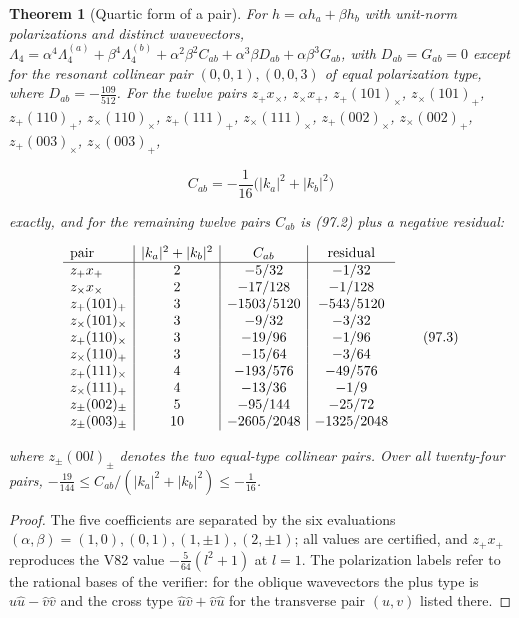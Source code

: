 \documentclass[11pt]{article}
\newtheorem{theorem}{Theorem}[section]
\theoremstyle{remark}
\begin{document}
\begin{theorem}[Quartic form of a pair]
\label{thm:v19v94-pairs}
For \(h=\alpha h_a+\beta h_b\) with unit-norm polarizations and
distinct wavevectors,
\(\Lambda_4=\alpha^4\Lambda_4^{(a)}+\beta^4\Lambda_4^{(b)}+\alpha^2\beta^2C_{ab}+\alpha^3\beta D_{ab}+\alpha\beta^3G_{ab}\),
with \(D_{ab}=G_{ab}=0\) except for the resonant collinear pair
\((0,0,1),(0,0,3)\) of equal polarization type, where
\(D_{ab}=-\tfrac{109}{512}\).  For the twelve pairs
\(z_+x_\times\), \(z_\times x_+\), \(z_+(101)_\times\), \(z_\times(101)_+\),
\(z_+(110)_+\), \(z_\times(110)_\times\), \(z_+(111)_+\), \(z_\times(111)_\times\),
\(z_+(002)_\times\), \(z_\times(002)_+\), \(z_+(003)_\times\), \(z_\times(003)_+\),

\[
 C_{ab}=-\frac1{16}\bigl(|k_a|^2+|k_b|^2\bigr)                          \tag{97.2}
\]

exactly, and for the remaining twelve pairs \(C_{ab}\) is (97.2) plus a
negative residual:

\[
\begin{array}{l|c|c|c}
\hbox{pair}&|k_a|^2+|k_b|^2&C_{ab}&\hbox{residual}\\ \hline
z_+x_+&2&-5/32&-1/32\\
z_\times x_\times&2&-17/128&-1/128\\
z_+(101)_+&3&-1503/5120&-543/5120\\
z_\times(101)_\times&3&-9/32&-3/32\\
z_+(110)_\times&3&-19/96&-1/96\\
z_\times(110)_+&3&-15/64&-3/64\\
z_+(111)_\times&4&-193/576&-49/576\\
z_\times(111)_+&4&-13/36&-1/9\\
z_\pm(002)_\pm&5&-95/144&-25/72\\
z_\pm(003)_\pm&10&-2605/2048&-1325/2048
\end{array}                                                            \tag{97.3}
\]

where \(z_\pm(00l)_\pm\) denotes the two equal-type collinear pairs.
Over all twenty-four pairs, \(-\tfrac{19}{144}\leq C_{ab}/(|k_a|^2+|k_b|^2)\leq-\tfrac1{16}\).
\end{theorem}

\begin{proof}
The five coefficients are separated by the six evaluations
\((\alpha,\beta)=(1,0),(0,1),(1,\pm1),(2,\pm1)\); all values are
certified, and \(z_+x_+\) reproduces the V82 value \(-\tfrac5{64}(l^2+1)\)
at \(l=1\).  The polarization labels refer to the rational bases of
the verifier: for the oblique wavevectors the plus type is
\(\hat u\hat u-\hat v\hat v\) and the cross type \(\hat u\hat v+\hat v\hat u\)
for the transverse pair \((u,v)\) listed there.
\end{proof}
\end{document}
